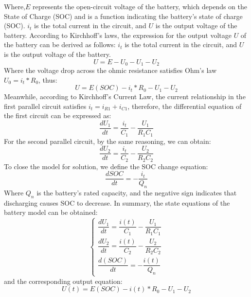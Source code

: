 \documentclass{mcmthesis}
\begin{document}
Where,$E$ represents the open-circuit voltage of the battery, which depends on the State of Charge (SOC) and is a function indicating the battery's state of charge (SOC).
$i_t$ is the total current in the circuit, and $U$ is the output voltage of the battery.
According to Kirchhoff's laws, the expression for the output voltage $U$ of the battery can be derived as follows: $i_t$ is the total current in the circuit, and $U$ is the output voltage of the battery.
\begin{equation}
  U=E-U_0-U_1-U_2
\end{equation}
Where the voltage drop across the ohmic resistance satisfies Ohm's law $U_0=i_t\ast R_0$, thus:
\begin{equation}
 U=E(SOC)-i_t\ast R_0-U_1-U_2   
\end{equation}
Meanwhile, according to Kirchhoff's Current Law, the current relationship in the first parallel circuit satisfies $i_t = i_{R1} + i_{C1}$,
therefore, the differential equation of the first circuit can be expressed as:
\begin{equation}
  \frac{dU_1}{dt}=\frac{i_t}{C_1}-\frac{U_1}{R_1C_1}
\end{equation}
For the second parallel circuit, by the same reasoning, we can obtain:
\begin{equation}
  \frac{dU_2}{dt}=\frac{i_t}{C_2}-\frac{U_2}{R_2C_2}
\end{equation}
To close the model for solution, we define the SOC change equation:
\begin{equation}
  \frac{dSOC}{dt}=-\frac{i_t}{Q_n}
\end{equation}
Where $Q_n$ is the battery's rated capacity, and the negative sign indicates that discharging causes SOC to decrease.
In summary, the state equations of the battery model can be obtained:
\begin{equation}
  \begin{cases}
    \dfrac{dU_1}{dt} = \dfrac{i(t)}{C_1} - \dfrac{U_1}{R_1C_1} \\[8pt]
    \dfrac{dU_2}{dt} = \dfrac{i(t)}{C_2} - \dfrac{U_2}{R_2C_2} \\[8pt]
    \dfrac{d(SOC)}{dt} = -\dfrac{i(t)}{Q_n}
  \end{cases}
\end{equation}
and the corresponding output equation:
\begin{equation}
  U(t)=E(SOC)-i(t)\ast R_0-U_1-U_2
\end{equation}
\end{document}
